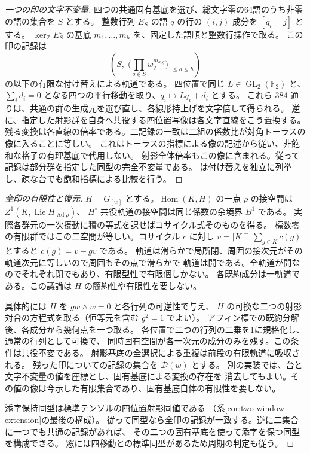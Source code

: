 \begin{proof}[一つの印の文字不変量]
四つの共通固有基底を選び、総文字零の64語のうち非零の語の集合を $S$ とする。
整数行列 $E_S$ の語 $q$ の行の $(i,j)$ 成分を $[q_i=j]$ とする。
$\ker_{\mathbb Z}E_S^{\mathsf t}$ の基底 $m_1,\ldots,m_h$ を、固定した語順と整数行操作で取る。
この印の記録は
\[
 \left(S,\;\big(\prod_{q\in S}w_q^{m_{a,q}}\big)_{1\le a\le h}\right)
\]
の以下の有限な付け替えによる軌道である。
四位置で同じ $L\in\operatorname{GL}_2(\mathbb F_2)$ と、
$\sum_i d_i=0$ となる四つの平行移動を取り、$q_i\mapsto Lq_i+d_i$ とする。
これら $384$ 通りは、共通の群の生成元を選び直し、各線形持上げを文字倍して得られる。
逆に、指定した射影群を自身へ共役する四位置写像は各文字直線をこう置換する。
残る変換は各直線の倍率である。二記録の一致は二組の係数比が対角トーラスの像に入ることに等しい。
これはトーラスの指標による像の記述から従い、非飽和な格子の有理基底で代用しない。
射影全体倍率もこの像に含まれる。従って記録は部分群を指定した同型の完全不変量である。
 は付け替えを独立に列挙し、疎な台でも飽和指標による比較を行う。
\end{proof}

\begin{proof}[全印の有限性と復元]
$H=G_{[w]}$ とする。$\operatorname{Hom}(K,H)$ の一点 $\rho$ の接空間は
$Z^1(K,\operatorname{Lie}H_{\operatorname{Ad}\rho})$、
$H^\circ$ 共役軌道の接空間は同じ係数の余境界 $B^1$ である。
実際各群元の一次摂動に積の等式を課せばコサイクル式そのものを得る。
標数零の有限群ではこの二空間が等しい。コサイクル $c$ に対し
$v=|K|^{-1}\sum_{g\in K}c(g)$ とすると $c(g)=v-gv$ である。
軌道は滑らかで局所閉、周囲の接次元がその軌道次元に等しいので周囲もその点で滑らかで
軌道は開である。全軌道が開なのでそれぞれ閉でもあり、有限型性で有限個しかない。
各既約成分は一軌道である。この議論は $H$ の簡約性や有限性を要しない。

具体的には $H$ を $g w\wedge w=0$ と各行列の可逆性で与え、
$H$ の可換な二つの射影対合の方程式を取る（恒等元を含む $g^2=1$ でよい）。
アフィン標での既約分解後、各成分から幾何点を一つ取る。
各位置で二つの行列の二乗を1に規格化し、通常の行列として可換で、
同時固有空間が各一次元の成分のみを残す。この条件は共役不変である。
射影基底の全選択による重複は前段の有限軌道に吸収される。
残った印についての記録の集合を $\mathcal D(w)$ とする。
別の実装では、台と文字不変量の値を座標とし、固有基底による変換の存在を
消去してもよい。その値の像は今示した有限集合であり、固有基底自体の有限性を要しない。

添字保持同型は標準テンソルの四位置射影同値である
（系\ref{cor:two-window-extension}の最後の構成）。
従って同型なら全印の記録が一致する。逆に二集合に一つでも共通の記録があれば、
その二つの固有基底を使って添字を保つ同型を構成できる。
窓には四移動との標準同型があるため周期の判定も従う。
\end{proof}

